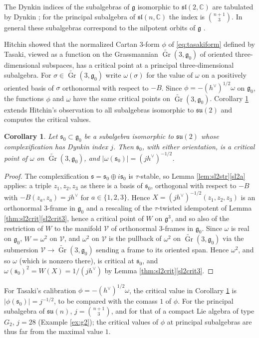 \documentclass [leqno, 10pt]{amsart}
\newtheorem{corollary}[theorem]{Corollary}%
\theoremstyle{definition}
\numberwithin{equation}{section}
\newcommand{\grass}{\operatorname{Gr}}
\newcommand{\om}{\omega}
\newcommand{\su}{\mathfrak{su}}
\newcommand{\sll}{\mathfrak{sl}}
\newcommand{\g}{\mathfrak{g}}
\newcommand{\com}{\mathbb C}
\newcommand{\gz}{\g_{0}}
\newcommand{\hv}{h^\vee}
\newcommand{\subs}{\mathfrak{s}}
\begin{document}
The Dynkin indices of the subalgebras of $\g$ isomorphic to $\sll(2, \com)$ are tabulated by Dynkin \cite{Dynkin-semisimplesubalgebras}; for the principal subalgebra of $\sll(n, \com)$ the index is $\binom{n+1}{3}$. In general these subalgebras correspond to the nilpotent orbits of $\g$ \cite{Collingwood-McGovern}.

Hitchin \cite[Theorem~1]{Hitchin-calibrations} showed that the normalized Cartan $3$-form $\phi$ of \eqref{eq:tasakiform} defined by Tasaki, viewed as a function on the Grassmannian $\widetilde{\grass}(3, \gz)$ of oriented three-dimensional subspaces, has a critical point at a principal three-dimensional subalgebra. For $\sigma \in \widetilde{\grass}(3, \gz)$ write $\om(\sigma)$ for the value of $\om$ on a positively oriented basis of $\sigma$ orthonormal with respect to $-B$. Since $\phi = -(\hv)^{1/2}\om$ on $\gz$, the functions $\phi$ and $\om$ have the same critical points on $\widetilde{\grass}(3, \gz)$. Corollary \ref{cor:hitchin} extends Hitchin's observation to all subalgebras isomorphic to $\su(2)$ and computes the critical values.

\begin{corollary}\label{cor:hitchin}
Let $\subs_{0} \subset \gz$ be a subalgebra isomorphic to $\su(2)$ whose complexification has Dynkin index $j$. Then $\subs_{0}$, with either orientation, is a critical point of $\om$ on $\widetilde{\grass}(3, \gz)$, and $|\om(\subs_{0})| = (j\hv)^{-1/2}$.
\end{corollary}
\begin{proof}
The complexification $\subs = \subs_{0} \oplus i\subs_{0}$ is $\tau$-stable, so Lemma \ref{lem:sl2str}\ref{sl2a} applies: a triple $z_{1}, z_{2}, z_{3}$ as there is a basis of $\subs_{0}$, orthogonal with respect to $-B$ with $-B(z_{a}, z_{a}) = j\hv$ for $a \in \{1, 2, 3\}$. Hence $X = (j\hv)^{-1/2}(z_{1}, z_{2}, z_{3})$ is an orthonormal $3$-frame in $\gz$ and a rescaling of the $\tau$-twisted idempotent of Lemma \ref{thm:sl2crit}\ref{sl2crit3}, hence a critical point of $W$ on $\g^{3}$, and so also of the restriction of $W$ to the manifold $\mathcal{V}$ of orthonormal $3$-frames in $\gz$. Since $\om$ is real on $\gz$, $W = \om^{2}$ on $\mathcal{V}$, and $\om^{2}$ on $\mathcal{V}$ is the pullback of $\om^{2}$ on $\widetilde{\grass}(3, \gz)$ via the submersion $\mathcal{V} \to \widetilde{\grass}(3, \gz)$ sending a frame to its oriented span. Hence $\om^{2}$, and so $\om$ (which is nonzero there), is critical at $\subs_{0}$, and $\om(\subs_{0})^{2} = W(X) = 1/(j\hv)$ by Lemma \ref{thm:sl2crit}\ref{sl2crit3}.
\end{proof}
For Tasaki's calibration $\phi = -(\hv)^{1/2}\om$, the critical value in Corollary \ref{cor:hitchin} is $|\phi(\subs_{0})| = j^{-1/2}$, to be compared with the comass $1$ of $\phi$. For the principal subalgebra of $\su(n)$, $j = \binom{n+1}{3}$, and for that of a compact Lie algebra of type $G_{2}$, $j = 28$ (Example \ref{ex:g2}); the critical values of $\phi$ at principal subalgebras are thus far from the maximal value $1$.
\end{document}

